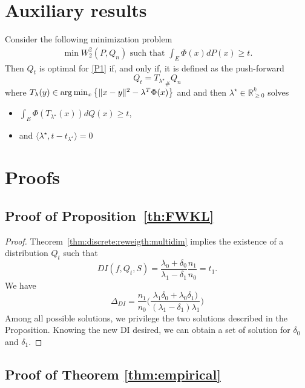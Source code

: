 \documentclass[runningheads, orivec]{llncs}
\newcommand{\R}{\mathbb{R}}
\begin{document}
\section{Auxiliary results}

\begin{proposition}\label{prop:extproje}
    Consider the following minimization problem 
\begin{align}\label{P1}
    \min W_2^2(P,Q_n) \text{ such that } \int_E \Phi(x)dP(x) \geq t.
\end{align}
Then $Q_t$ is optimal for \eqref{P1} if, and only if, it is defined as the push-forward
\[ Q_t = {T_{\lambda^\star}}_{\#}Q_n \]
 where 
$ T_\lambda(y) \in {\rm arg}\min_{x}  \left\{\|x-y\|^2-\lambda^T \Phi(x) \right\}   $ and 
and then $\lambda^\star\in\R^k_{\geq0}$ solves 
\begin{itemize}
    \item $\int_E \Phi(T_{\lambda^\star}(x))dQ(x) \geq t $,
    \item and $\langle \lambda^\star ,  t-t_{\lambda^\star} \rangle=0$ 
\end{itemize} 
\end{proposition}

\section{Proofs}

\subsection{Proof of Proposition~\ref{th:FWKL}}
\begin{proof}
    
Theorem~\ref{thm:discrete:reweigth:multidim} implies the existence of a distribution $Q_t$ such that \[DI(f,Q_t,S)= \frac{\lambda_0 + \delta_0}{\lambda_1 - \delta_1}\frac{n_1}{n_0}=t_1. \]
 We have
\[\Delta_{DI} =
 \frac{n_1}{n_0}\bigg( \frac{\lambda_1 \delta_0 + \lambda_0 \delta_1)}{(\lambda_1 - \delta_1)\lambda_1}\bigg)
\] 
Among all possible solutions, we privilege the two solutions described in the Proposition. Knowing the new DI desired, we can obtain a set of solution for $\delta_0$ and $\delta_1$.
 \end{proof}

\subsection{Proof of Theorem \ref{thm:empirical}}
\end{document}

